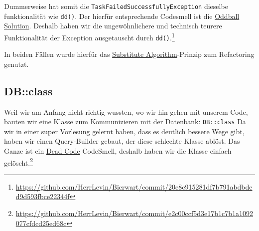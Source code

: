 \documentclass[12pt,a4paper,titlepage,ngerman,pdftex]{report}
\begin{document}
    Dummerweise hat somit die \verb|TaskFailedSuccessfullyException| dieselbe funktionalität wie \verb|dd()|.
    Der hierfür entsprechende Codesmell ist die \href{https://pragmaticways.com/31-code-smells-you-must-know/#6_Oddball_Solution}{Oddball Solution}.
    Deshalb haben wir die ungewöhnlichere und technisch teurere Funktionalität der Exception ausgetauscht durch \verb|dd()|.\footnote{\url{https://github.com/HerrLevin/Bierwart/commit/20e8c915281df7b791abdbded9d593fbce22344f}}

    In beiden Fällen wurde hierfür das \href{https://refactoring.guru/substitute-algorithm}{Substitute Algorithm}-Prinzip zum Refactoring genutzt.

    \subsection{DB::class}\label{subsec:db::class}
    Weil wir am Anfang nicht richtig wussten, wo wir hin gehen mit unserem Code, bauten wir eine Klasse zum Kommunizieren mit der Datenbank: \verb|DB::class|
    Da wir in einer super Vorlesung gelernt haben, dass es deutlich bessere Wege gibt, haben wir einen Query-Builder gebaut, der diese schlechte Klasse ablöst.
    Das Ganze ist ein \href{https://refactoring.guru/smells/dead-code}{Dead Code} CodeSmell, deshalb haben wir die Klasse einfach gelöscht.\footnote{\url{https://github.com/HerrLevin/Bierwart/commit/e2c00ccf5d3e17b1c7b1a1092077cfdcd25ed68c}}
\end{document}

